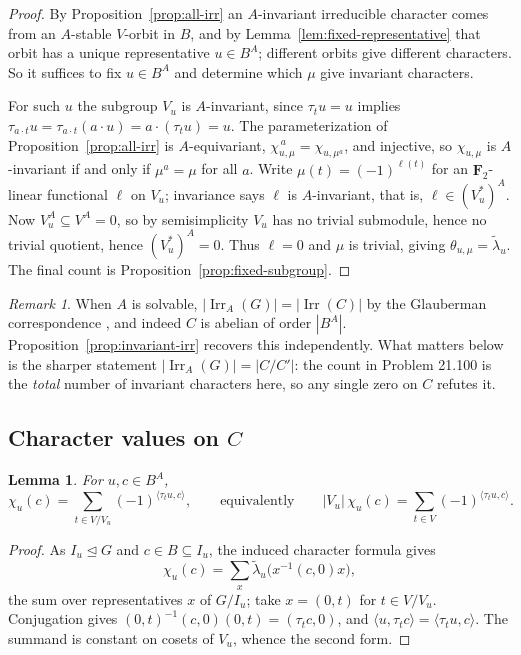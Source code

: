 \documentclass[11pt,a4paper,reqno]{amsart}
\newtheorem{lemma}[theorem]{Lemma}
\theoremstyle{definition}
\theoremstyle{remark}
\newtheorem{remark}[theorem]{Remark}
\newcommand{\F}{\mathbf F}
\newcommand{\Irr}{\operatorname{Irr}}
\begin{document}
\begin{proof}
By Proposition~\ref{prop:all-irr} an $A$-invariant irreducible
character comes from an $A$-stable $V$-orbit in $B$, and by
Lemma~\ref{lem:fixed-representative} that orbit has a unique
representative $u\in B^A$; different orbits give different characters.
So it suffices to fix $u\in B^A$ and determine which $\mu$ give
invariant characters.

For such $u$ the subgroup $V_u$ is $A$-invariant, since $\tau_tu=u$
implies $\tau_{a\cdot t}u=\tau_{a\cdot t}(a\cdot u)=a\cdot(\tau_tu)=u$.  The
parameterization of Proposition~\ref{prop:all-irr} is $A$-equivariant,
$\chi_{u,\mu}^{\,a}=\chi_{u,\mu^a}$, and injective, so $\chi_{u,\mu}$
is $A$-invariant if and only if $\mu^a=\mu$ for all $a$.  Write
$\mu(t)=(-1)^{\ell(t)}$ for an $\F_2$-linear functional $\ell$ on
$V_u$; invariance says $\ell$ is $A$-invariant, that is,
$\ell\in(V_u^*)^A$.  Now $V_u^A\subseteq V^A=0$, so by semisimplicity
$V_u$ has no trivial submodule, hence no trivial quotient, hence
$(V_u^*)^A=0$.  Thus $\ell=0$ and $\mu$ is trivial, giving
$\theta_{u,\mu}=\widetilde\lambda_u$.  The final count is
Proposition~\ref{prop:fixed-subgroup}.
\end{proof}

\begin{remark}
When $A$ is solvable, $|\Irr_A(G)|=|\Irr(C)|$ by the Glauberman
correspondence \cite{glauberman}, and indeed $C$ is abelian of order
$|B^A|$.  Proposition~\ref{prop:invariant-irr} recovers this
independently.  What matters below is the sharper statement
$|\Irr_A(G)|=|C/C'|$: the count in Problem 21.100 is the
\emph{total} number of invariant characters here, so any single zero on
$C$ refutes it.
\end{remark}

\subsection{Character values on \texorpdfstring{$C$}{C}}

\begin{lemma}\label{lem:value-formula}
For $u,c\in B^A$,
\[
 \chi_u(c)=\sum_{t\in V/V_u}(-1)^{\langle\tau_tu,c\rangle},
 \qquad\text{equivalently}\qquad
 |V_u|\,\chi_u(c)=\sum_{t\in V}(-1)^{\langle\tau_tu,c\rangle}.
\]
\end{lemma}

\begin{proof}
As $I_u\trianglelefteq G$ and $c\in B\subseteq I_u$, the induced
character formula gives
\[
 \chi_u(c)=\sum_x\widetilde\lambda_u\bigl(x^{-1}(c,0)x\bigr),
\]
the sum over representatives $x$ of $G/I_u$; take $x=(0,t)$ for
$t\in V/V_u$.
Conjugation gives $(0,t)^{-1}(c,0)(0,t)=(\tau_tc,0)$, and
$\langle u,\tau_tc\rangle=\langle\tau_tu,c\rangle$.  The summand is
constant on cosets of $V_u$, whence the second form.
\end{proof}
\end{document}
